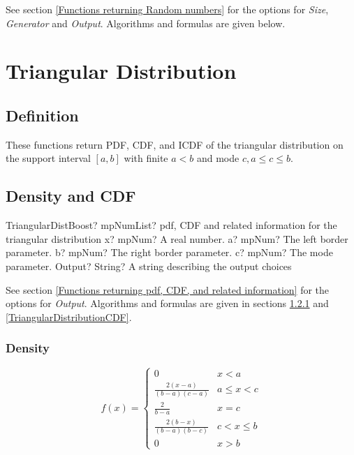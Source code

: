 \vspace{0.3cm}
See section \ref{Functions returning Random numbers} for the options for  {\itshape\sffamily Size},  {\itshape\sffamily Generator} and {\itshape\sffamily Output}. Algorithms and formulas are given below.





\newpage
\section{Triangular Distribution}

\subsection{Definition}
These functions return PDF, CDF, and ICDF of the triangular distribution on the
support interval $[a, b]$ with finite $a < b$ and mode $c, a \leq c \leq b$.

\subsection{Density and CDF}

\begin{mpFunctionsExtract}
	\mpFunctionFiveNotImplemented
	{TriangularDistBoost? mpNumList? pdf, CDF and related information for the triangular distribution}
	{x? mpNum? A real number.}
	{a? mpNum? The left border parameter.}
	{b? mpNum? The right border parameter.}
	{c? mpNum? The mode parameter.}
	{Output? String? A string describing the output choices}
\end{mpFunctionsExtract}


\vspace{0.3cm}
See section \ref{Functions returning pdf, CDF, and related information} for the options for {\itshape\sffamily Output}. Algorithms and formulas are given in sections \ref{TriangularDistributionDensity} and \ref{TriangularDistributionCDF}.



\subsubsection{Density}
\label{TriangularDistributionDensity}

\begin{equation}
	f(x)=\begin{cases}
		0  & x<a\\
		\frac{2(x-a)}{(b-a)(c-a)} & a \leq x < c\\
		\frac{2}{b-a} & x = c\\
		\frac{2(b-x)}{(b-a)(b-c)} & c < x \leq b\\
		0  & x>b
	\end{cases}
\end{equation}


